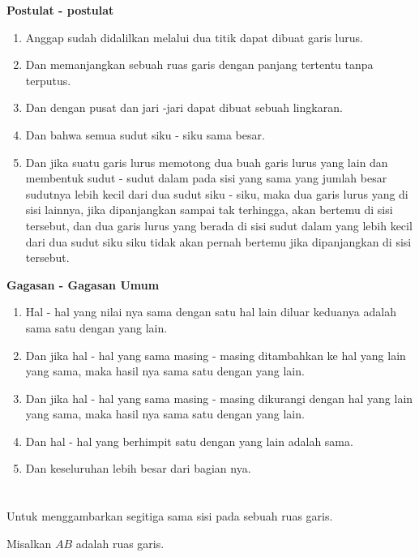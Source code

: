 \documentclass[a4paper]{book}
\begin{document}
\begin{center}
\textbf{Postulat - postulat}
\end{center}
\begin{enumerate}
\item Anggap sudah didalilkan melalui dua titik dapat dibuat garis lurus.
\item Dan memanjangkan sebuah ruas garis dengan panjang tertentu tanpa terputus.
\item Dan dengan pusat dan jari -jari dapat dibuat sebuah lingkaran.
\item Dan bahwa semua sudut siku - siku sama besar.
\item Dan jika suatu garis lurus memotong dua buah garis lurus yang lain dan membentuk sudut - sudut dalam pada sisi yang sama yang jumlah besar sudutnya lebih kecil dari dua  sudut siku - siku, maka dua garis lurus yang di sisi lainnya, jika dipanjangkan sampai tak terhingga, akan bertemu di sisi tersebut, dan dua garis lurus yang berada di sisi sudut dalam yang lebih kecil dari dua sudut siku siku tidak akan pernah bertemu jika dipanjangkan di sisi tersebut.
\end{enumerate}

\begin{center}
\textbf{Gagasan - Gagasan Umum}
\end{center}
\begin{enumerate}
\item Hal - hal yang nilai nya sama dengan satu hal lain diluar keduanya adalah sama satu dengan yang lain. 
\item Dan jika hal - hal yang sama masing - masing ditambahkan ke hal yang lain yang sama, maka hasil nya sama satu dengan yang lain. 
\item Dan jika hal - hal yang sama masing - masing dikurangi dengan hal yang lain yang sama, maka hasil nya sama satu dengan yang lain. 
\item Dan hal - hal yang berhimpit satu dengan yang lain adalah sama.
\item Dan keseluruhan lebih besar dari bagian nya.
\end{enumerate}

\section*{\centering \thesection} 
Untuk menggambarkan segitiga sama sisi pada sebuah ruas garis.
\begin{center}
\end{center}
Misalkan $AB$ adalah ruas garis.
\end{document}
